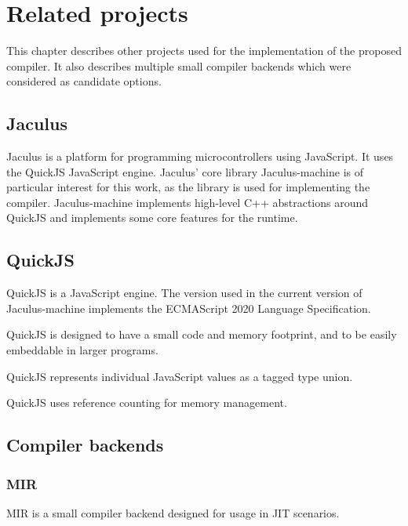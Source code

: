 \chapter{Related projects}

This chapter describes other projects used for the implementation of the proposed compiler. It also describes multiple small compiler backends which were considered as candidate options.

\section{Jaculus}

Jaculus is a platform for programming microcontrollers using JavaScript. It uses the QuickJS JavaScript engine. Jaculus' core library Jaculus-machine is of particular interest for this work, as the library is used for implementing the compiler. Jaculus-machine implements high-level C++ abstractions around QuickJS and implements some core features for the runtime.

\section{QuickJS}

QuickJS is a JavaScript engine. The version used in the current version of Jaculus-machine implements the ECMAScript 2020 Language Specification\cite{ecma262}.

QuickJS is designed to have a small code and memory footprint, and to be easily embeddable in larger programs.

QuickJS represents individual JavaScript values as a tagged type union.

QuickJS uses reference counting for memory management.



\section{Compiler backends}


\subsection{MIR}

MIR is a small compiler backend designed for usage in JIT scenarios.
